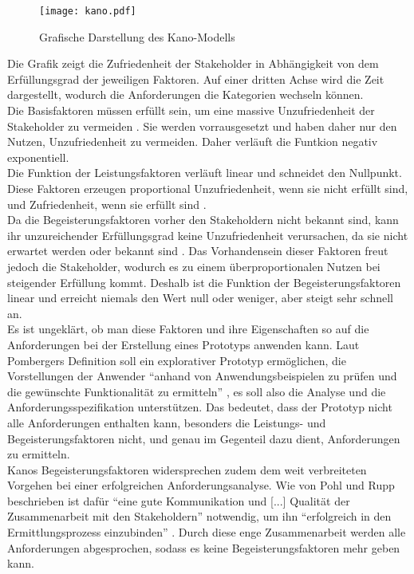 \documentclass [12pt, a4paper, oneside, titlepage, ngerman]{article}
\begin{document}
\begin{figure}[H]
	\centering
	\texttt{[image: kano.pdf]}
	\caption{Grafische Darstellung des Kano-Modells}
	\cite[S.25]{PohlRupp2015}
	\label{img:kano}
\end{figure}
\noindent Die Grafik zeigt die Zufriedenheit der Stakeholder in Abhängigkeit von dem Erfüllungsgrad der jeweiligen Faktoren. Auf einer dritten Achse wird die Zeit dargestellt, wodurch die Anforderungen die Kategorien wechseln können. \\
Die Basisfaktoren müssen erfüllt sein, um eine massive Unzufriedenheit der Stakeholder zu vermeiden \cite[vgl. S.106]{Kano}. Sie werden vorrausgesetzt und haben daher nur den Nutzen, Unzufriedenheit zu vermeiden. Daher verläuft die Funtkion negativ exponentiell. \\
Die Funktion der Leistungsfaktoren verläuft linear und schneidet den Nullpunkt. Diese Faktoren erzeugen proportional Unzufriedenheit, wenn sie nicht erfüllt sind, und Zufriedenheit, wenn sie erfüllt sind \cite[vgl. S.106]{Kano}. \\
Da die Begeisterungsfaktoren vorher den Stakeholdern nicht bekannt sind, kann ihr unzureichender Erfüllungsgrad keine Unzufriedenheit verursachen, da sie nicht erwartet werden oder bekannt sind \cite[vgl. S.106]{Kano}. Das Vorhandensein dieser Faktoren freut jedoch die Stakeholder, wodurch es zu einem überproportionalen Nutzen bei steigender Erfüllung kommt. Deshalb ist die Funktion der Begeisterungsfaktoren linear und erreicht niemals den Wert null oder weniger, aber steigt sehr schnell an. \\

\noindent Es ist ungeklärt, ob man diese Faktoren und ihre Eigenschaften so auf die Anforderungen bei der Erstellung eines Prototyps anwenden kann. Laut Pombergers Definition soll ein explorativer Prototyp ermöglichen, die Vorstellungen der Anwender "`anhand von Anwendungsbeispielen zu prüfen und die gewünschte Funktionalität zu ermitteln"' \cite[S.27]{pomberger2004}, es soll also die Analyse und die Anforderungsspezifikation unterstützen. Das bedeutet, dass der Prototyp nicht alle Anforderungen enthalten kann, besonders die Leistungs- und Begeisterungsfaktoren nicht, und genau im Gegenteil dazu dient, Anforderungen zu ermitteln. \\
Kanos Begeisterungsfaktoren widersprechen zudem dem weit verbreiteten Vorgehen bei einer erfolgreichen Anforderungsanalyse. Wie von Pohl und Rupp beschrieben ist dafür "`eine gute Kommunikation und [...] Qualität der Zusammenarbeit mit den Stakeholdern"' \cite[S.33]{PohlRupp2015} notwendig, um ihn "`erfolgreich in den Ermittlungsprozess einzubinden"' \cite[S.34]{PohlRupp2015}. Durch diese enge Zusammenarbeit werden alle Anforderungen abgesprochen, sodass es keine Begeisterungsfaktoren mehr geben kann.
\end{document}
